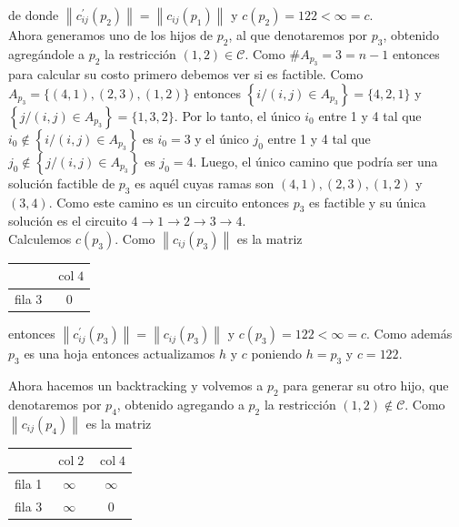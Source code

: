 \documentclass[10pt]{article}
\begin{document}
de donde $\left\|c_{i j}^{\prime}\left(p_{2}\right)\right\|=\left\|c_{i j}\left(p_{1}\right)\right\|$ y $c\left(p_{2}\right)=122<\infty=c$.\\
Ahora generamos uno de los hijos de $p_{2}$, al que denotaremos por $p_{3}$, obtenido agregándole a $p_{2}$ la restricción $(1,2) \in \mathcal{C}$. Como $\# A_{p_{3}}=3=n-1$ entonces para calcular su costo primero debemos ver si es factible. Como $A_{p_{3}}=\{(4,1),(2,3),(1,2)\}$ entonces $\left\{i /(i, j) \in A_{p_{3}}\right\}=\{4,2,1\}$ y $\left\{j /(i, j) \in A_{p_{3}}\right\}=\{1,3,2\}$. Por lo tanto, el único $i_{0}$ entre 1 y 4 tal que $i_{0} \notin\left\{i /(i, j) \in A_{p_{3}}\right\}$ es $i_{0}=3$ y el único $j_{0}$ entre 1 y 4 tal que $j_{0} \notin\left\{j /(i, j) \in A_{p_{3}}\right\}$ es $j_{0}=4$. Luego, el único camino que podría ser una solución factible de $p_{3}$ es aquél cuyas ramas son $(4,1),(2,3),(1,2)$ y $(3,4)$. Como este camino es un circuito entonces $p_{3}$ es factible y su única solución es el circuito $4 \longrightarrow 1 \longrightarrow 2 \longrightarrow 3 \longrightarrow 4$.\\
Calculemos $c\left(p_{3}\right)$. Como $\left\|c_{i j}\left(p_{3}\right)\right\|$ es la matriz

\begin{center}
\begin{tabular}{|c|c|}
\hline
 & $\operatorname{col} 4$ \\
\hline
fila 3 & 0 \\
\hline
\end{tabular}
\end{center}

entonces $\left\|c_{i j}^{\prime}\left(p_{3}\right)\right\|=\left\|c_{i j}\left(p_{3}\right)\right\|$ y $c\left(p_{3}\right)=122<\infty=c$. Como además $p_{3}$ es una hoja entonces actualizamos $h$ y $c$ poniendo $h=p_{3}$ y $c=122$.

Ahora hacemos un backtracking y volvemos a $p_{2}$ para generar su otro hijo, que denotaremos por $p_{4}$, obtenido agregando a $p_{2}$ la restricción $(1,2) \notin \mathcal{C}$. Como $\left\|c_{i j}\left(p_{4}\right)\right\|$ es la matriz

\begin{center}
\begin{tabular}{|l|c|c|}
\hline
 & $\operatorname{col} 2$ & $\operatorname{col} 4$ \\
\hline
fila 1 & $\infty$ & $\infty$ \\
\hline
fila 3 & $\infty$ & 0 \\
\hline
\end{tabular}
\end{center}
\end{document}
